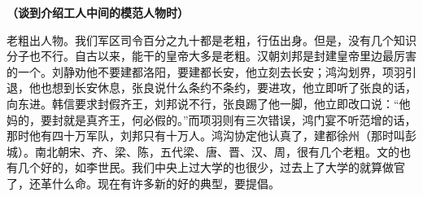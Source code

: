 \textbf{（谈到介绍工人中间的模范人物时）}

老粗出人物。我们军区司令百分之九十都是老粗，行伍出身。但是，没有几个知识分子也不行。自古以来，能干的皇帝大多是老粗。汉朝刘邦是封建皇帝里边最厉害的一个。刘静劝他不要建都洛阳，要建都长安，他立刻去长安；鸿沟划界，项羽引退，他也想到长安休息，张良说什么条约不条约，要进攻，他立即听了张良的话，向东进。韩信要求封假齐王，刘邦说不行，张良踢了他一脚，他立即改口说：“他妈的，要封就是真齐王，何必假的。”而项羽则有三次错误，鸿门宴不听范增的话，那时他有四十万军队，刘邦只有十万人。鸿沟协定他认真了，建都徐州（那时叫彭城）。南北朝宋、齐、梁、陈，五代梁、唐、晋、汉、周，很有几个老粗。文的也有几个好的，如李世民。我们中央上过大学的也很少，过去上了大学的就算做官了，还革什么命。现在有许多新的好的典型，要提倡。


